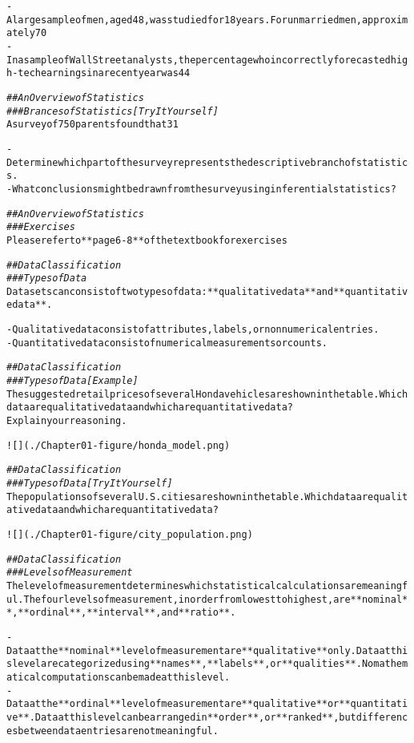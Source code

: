 \documentclass{article}\usepackage[]{graphicx}\usepackage[]{color}
\makeatletter
\newcommand{\hlcom}[1]{\textcolor[rgb]{0.678,0.584,0.686}{\textit{#1}}}%
\newenvironment{kframe}{%
 \def\at@end@of@kframe{}%
 \ifinner\ifhmode%
  \def\at@end@of@kframe{\end{minipage}}%
  \begin{minipage}{\columnwidth}%
 \fi\fi%
 \def\FrameCommand##1{\hskip\@totalleftmargin \hskip-\fboxsep
 \colorbox{shadecolor}{##1}\hskip-\fboxsep
     \hskip-\linewidth \hskip-\@totalleftmargin \hskip\columnwidth}%
 \MakeFramed {\advance\hsize-\width
   \@totalleftmargin\z@ \linewidth\hsize
   \@setminipage}}%
 {\par\unskip\endMakeFramed%
 \at@end@of@kframe}
\newenvironment{knitrout}{}{} %
\makeatother
\begin{document}
\begin{knitrout}
\begin{kframe}
\begin{alltt}
- A large sample of men, aged 48, was studied for 18 years. For unmarried men, approximately 70% were alive at age 65. For married men, 90% were alive at age 65.
- In a sample of Wall Street analysts, the percentage who incorrectly forecasted high-tech earnings in a recent year was 44%.

\hlcom{## An Overview of Statistics}
\hlcom{### Brances of Statistics [Try It Yourself]}
A survey of 750 parents found that 31% support their kids financially until they graduate college, and 6% provide financial support until they start college.

- Determine which part of the survey represents the descriptive branch of statistics.
- What conclusions might be drawn from the survey using inferential statistics?

\hlcom{## An Overview of Statistics}
\hlcom{### Exercises}
Please refer to **page 6-8** of the textbook for exercises

\hlcom{## Data Classification}
\hlcom{### Types of Data}
Data sets can consist of two types of data: **qualitative data** and **quantitative data**.

- Qualitative data consist of attributes, labels, or nonnumerical entries.
- Quantitative data consist of numerical measurements or counts.

\hlcom{## Data Classification}
\hlcom{### Types of Data [Example]}
The suggested retail prices of several Honda vehicles are shown in the table. Which data are qualitative data and which are quantitative data? Explain your reasoning.

![](./Chapter01-figure/honda_model.png)

\hlcom{## Data Classification}
\hlcom{### Types of Data [Try It Yourself]}
The populations of several U.S. cities are shown in the table. Which data are qualitative data and which are quantitative data?

![](./Chapter01-figure/city_population.png)

\hlcom{## Data Classification}
\hlcom{### Levels of Measurement}
The level of measurement determines which statistical calculations are meaningful. The four levels of measurement, in order from lowest to highest, are **nominal**, **ordinal**, **interval**, and **ratio**.

- Data at the **nominal** level of measurement are **qualitative** only. Data at this level are categorized using **names**, **labels**, or **qualities**. No mathematical computations can be made at this level.
- Data at the **ordinal** level of measurement are **qualitative** or **quantitative**. Data at this level can be arranged in **order**, or **ranked**, but differences between data entries are not meaningful.


\end{alltt}
\end{kframe}
\end{knitrout}
\end{document}
